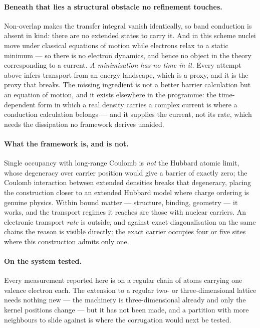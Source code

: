 \documentclass[11pt]{article}
\begin{document}
\paragraph{Beneath that lies a structural obstacle no refinement touches.} Non-overlap makes the
transfer integral vanish identically, so band conduction is absent in kind: there are no extended
states to carry it. And in this scheme nuclei move under classical equations of motion while
electrons relax to a static minimum --- so there is no electron dynamics, and hence no object in the
theory corresponding to a current. \emph{A minimisation has no time in it.} Every attempt above
infers transport from an energy landscape, which is a proxy, and it is the proxy that breaks. The
missing ingredient is not a better barrier calculation but an equation of motion, and it exists
elsewhere in the programme: the time-dependent form in which a real density carries a complex
current is where a conduction calculation belongs --- and it supplies the current, not its rate,
which needs the dissipation no framework derives unaided.

\paragraph{What the framework is, and is not.} Single occupancy with long-range Coulomb is
\emph{not} the Hubbard atomic limit, whose degeneracy over carrier position would give a barrier of
exactly zero; the Coulomb interaction between extended densities breaks that degeneracy, placing the
construction closer to an extended Hubbard model where charge ordering is genuine physics. Within
bound matter --- structure, binding, geometry --- it works, and the transport regimes it reaches are
those with nuclear carriers. An electronic transport \emph{rate} is outside, and against exact diagonalisation on
the same chains the reason is visible directly: the exact carrier occupies four or five sites where
this construction admits only one.

\paragraph{On the system tested.} Every measurement reported here is on a regular chain of atoms
carrying one valence electron each. The extension to a regular two- or three-dimensional lattice
needs nothing new --- the machinery is three-dimensional already and only the kernel positions
change --- but it has not been made, and a partition with more neighbours to slide against is where
the corrugation would next be tested.
\end{document}
